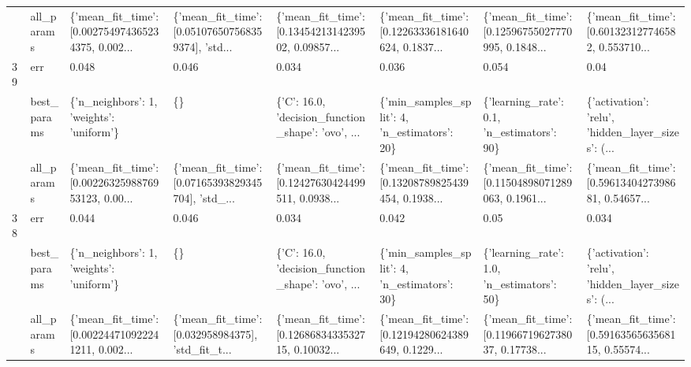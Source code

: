 \begin{tabular}{llllllll}
   & all\_params &  \{'mean\_fit\_time': [0.002754974365234375, 0.002... &  \{'mean\_fit\_time': [0.051076507568359374], 'std... &  \{'mean\_fit\_time': [0.1345421314239502, 0.09857... &  \{'mean\_fit\_time': [0.12263336181640624, 0.1837... &  \{'mean\_fit\_time': [0.12596755027770995, 0.1848... &  \{'mean\_fit\_time': [0.601323127746582, 0.553710... \\
39 & err &                                              0.048 &                                              0.046 &                                              0.034 &                                              0.036 &                                              0.054 &                                               0.04 \\
   & best\_params &           \{'n\_neighbors': 1, 'weights': 'uniform'\} &                                                 \{\} &  \{'C': 16.0, 'decision\_function\_shape': 'ovo', ... &       \{'min\_samples\_split': 4, 'n\_estimators': 20\} &         \{'learning\_rate': 0.1, 'n\_estimators': 90\} &  \{'activation': 'relu', 'hidden\_layer\_sizes': (... \\
   & all\_params &  \{'mean\_fit\_time': [0.0022632598876953123, 0.00... &  \{'mean\_fit\_time': [0.07165393829345704], 'std\_... &  \{'mean\_fit\_time': [0.12427630424499511, 0.0938... &  \{'mean\_fit\_time': [0.13208789825439454, 0.1938... &  \{'mean\_fit\_time': [0.11504898071289063, 0.1961... &  \{'mean\_fit\_time': [0.5961340427398681, 0.54657... \\
38 & err &                                              0.044 &                                              0.046 &                                              0.034 &                                              0.042 &                                               0.05 &                                              0.034 \\
   & best\_params &           \{'n\_neighbors': 1, 'weights': 'uniform'\} &                                                 \{\} &  \{'C': 16.0, 'decision\_function\_shape': 'ovo', ... &       \{'min\_samples\_split': 4, 'n\_estimators': 30\} &         \{'learning\_rate': 1.0, 'n\_estimators': 50\} &  \{'activation': 'relu', 'hidden\_layer\_sizes': (... \\
   & all\_params &  \{'mean\_fit\_time': [0.002244710922241211, 0.002... &  \{'mean\_fit\_time': [0.032958984375], 'std\_fit\_t... &  \{'mean\_fit\_time': [0.1268683433532715, 0.10032... &  \{'mean\_fit\_time': [0.12194280624389649, 0.1229... &  \{'mean\_fit\_time': [0.1196671962738037, 0.17738... &  \{'mean\_fit\_time': [0.5916356563568115, 0.55574... \\
\bottomrule
\end{tabular}
